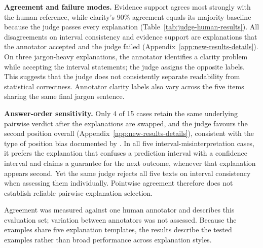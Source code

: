 \textbf{Agreement and failure modes.}
Evidence support agrees most strongly with the human reference, while clarity's 90\% agreement equals its majority baseline because the judge passes every explanation (Table~\ref{tab:judge-human-results}).
All disagreements on interval consistency and evidence support are explanations that the annotator accepted and the judge failed (Appendix~\ref{app:new-results-details}).
On three jargon-heavy explanations, the annotator identifies a clarity problem while accepting the interval statements; the judge assigns the opposite labels.
This suggests that the judge does not consistently separate readability from statistical correctness.
Annotator clarity labels also vary across the five items sharing the same final jargon sentence.

\textbf{Answer-order sensitivity.}
Only 4 of 15 cases retain the same underlying pairwise verdict after the explanations are swapped, and the judge favours the second position overall (Appendix~\ref{app:new-results-details}), consistent with the type of position bias documented by \citet{zheng2023judging}.
In all five interval-misinterpretation cases, it prefers the explanation that confuses a prediction interval with a confidence interval and claims a guarantee for the next outcome, whenever that explanation appears second.
Yet the same judge rejects all five texts on interval consistency when assessing them individually.
Pointwise agreement therefore does not establish reliable pairwise explanation selection.

Agreement was measured against one human annotator and describes this evaluation set; variation between annotators was not assessed.
Because the examples share five explanation templates, the results describe the tested examples rather than broad performance across explanation styles.
